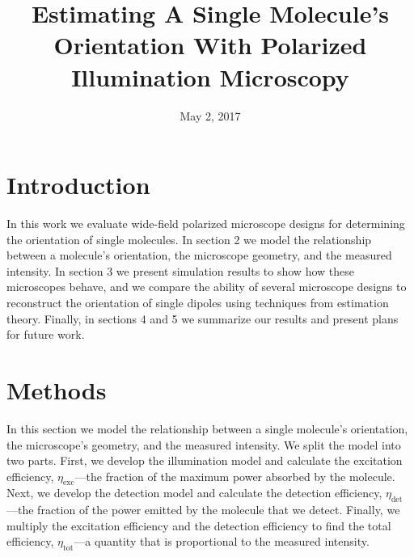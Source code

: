 \documentclass[11pt]{article}
\begin{document}
\title{\vspace{-2.5em}Estimating A Single Molecule's Orientation With Polarized
  Illumination Microscopy\vspace{-2em}} \author{}%
\date{\vspace{-1em}May 2, 2017\vspace{-1em}}
\maketitle

\section{Introduction}
In this work we evaluate wide-field polarized microscope designs for determining
the orientation of single molecules. In section 2 we model the relationship
between a molecule's orientation, the microscope geometry, and the measured
intensity. In section 3 we present simulation results to show how these
microscopes behave, and we compare the ability of several microscope designs to
reconstruct the orientation of single dipoles using techniques from estimation
theory. Finally, in sections 4 and 5 we summarize our results and present plans
for future work.

\section{Methods}
In this section we model the relationship between a single molecule's
orientation, the microscope's geometry, and the measured intensity. We split the
model into two parts. First, we develop the illumination model and calculate the
excitation efficiency, $\eta_{\text{exc}}$---the fraction of the maximum power
absorbed by the molecule. Next, we develop the detection model and calculate the
detection efficiency, $\eta_{\text{det}}$---the fraction of the power emitted by
the molecule that we detect. Finally, we multiply the excitation efficiency and
the detection efficiency to find the total efficiency, $\eta_{\text{tot}}$---a
quantity that is proportional to the measured intensity. 
\end{document}

